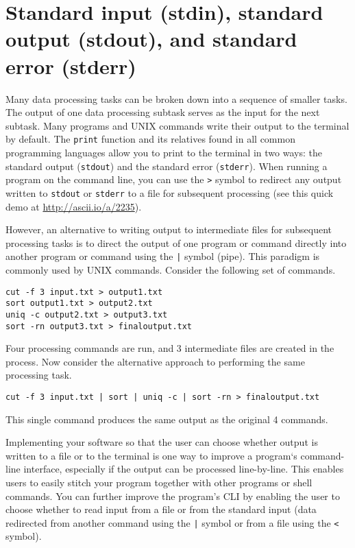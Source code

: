 \documentclass{article}
\begin{document}
\section{Standard input (stdin), standard output (stdout), and standard error (stderr)}
Many data processing tasks can be broken down into a sequence of smaller tasks. The output of one data processing subtask serves as the input for the next subtask. Many programs and UNIX commands write their output to the terminal by default. The \texttt{print} function and its relatives found in all common programming languages allow you to print to the terminal in two ways: the standard output (\texttt{stdout}) and the standard error (\texttt{stderr}). When running a program on the command line, you can use the \texttt{>} symbol to redirect any output written to \texttt{stdout} or \texttt{stderr} to a file for subsequent processing (see this quick demo at \url{http://ascii.io/a/2235}).

However, an alternative to writing output to intermediate files for subsequent processing tasks is to direct the output of one program or command directly into another program or command using the \texttt{|} symbol (pipe). This paradigm is commonly used by UNIX commands. Consider the following set of commands.

\begin{verbatim}
cut -f 3 input.txt > output1.txt
sort output1.txt > output2.txt
uniq -c output2.txt > output3.txt
sort -rn output3.txt > finaloutput.txt
\end{verbatim}
Four processing commands are run, and 3 intermediate files are created in the process. Now consider the alternative approach to performing the same processing task.
\begin{verbatim}
cut -f 3 input.txt | sort | uniq -c | sort -rn > finaloutput.txt
\end{verbatim}
This single command produces the same output as the original 4 commands.

Implementing your software so that the user can choose whether output is written to a file or to the terminal is one way to improve a program`s command-line interface, especially if the output can be processed line-by-line. This enables users to easily stitch your program together with other programs or shell commands. You can further improve the program's CLI by enabling the user to choose whether to read input from a file or from the standard input (data redirected from another command using the \texttt{|} symbol or from a file using the \texttt{<} symbol).
\end{document}
